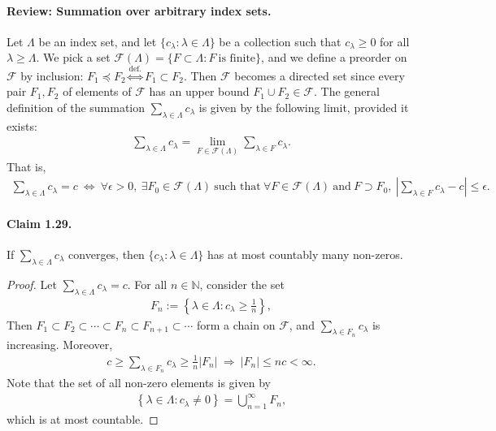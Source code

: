 \documentclass{article}
\begin{document}
\paragraph{Review: Summation over arbitrary index sets.} Let $\Lambda$ be an index set, and let $\{c_\lambda:\lambda\in\Lambda\}$ be a collection such that $c_\lambda\geq 0$ for all $\lambda\geq\Lambda$. We pick a set $\mathscr{F}(\Lambda)=\{F\subset\Lambda: F\ \text{is finite}\}$, and we define a preorder on $\mathscr{F}$ by inclusion: $F_1\preceq F_2\overset{\mathrm{def.}}{\Leftrightarrow} F_1\subset F_2$. Then $\mathscr{F}$ becomes a directed set since every pair $F_1,F_2$ of elements of $\mathscr{F}$ has an upper bound $F_1\cup F_2\in \mathscr{F}$. The general definition of the summation $\sum_{\lambda\in\Lambda} c_\lambda$ is given by the following limit, provided it exists:
\begin{align*}
	\sum_{\lambda\in\Lambda} c_\lambda = \lim_{F\in\mathscr{F}(\Lambda)}\sum_{\lambda\in F} c_\lambda.
\end{align*}
That is,
\begin{align*}
	\sum_{\lambda\in\Lambda} c_\lambda = c\ \Leftrightarrow\ \forall\epsilon > 0,\ \exists F_0\in\mathscr{F}(\Lambda)\ \text{such that}\ \forall F\in\mathscr{F}(\Lambda)\ \text{and}\ F\supset F_0,\ \left\vert\sum_{\lambda\in F}c_\lambda - c\right\vert\leq\epsilon.
\end{align*}
\paragraph{Claim 1.29.\label{claim:1.29}} If $\sum_{\lambda\in\Lambda}c_\lambda$ converges, then $\{c_\lambda:\lambda\in\Lambda\}$ has at most countably many non-zeros.

\begin{proof}
Let $\sum_{\lambda\in\Lambda}c_\lambda = c$. For all $n\in\mathbb{N}$, consider the set
\begin{align*}
	F_n:=\left\{\lambda\in\Lambda:c_\lambda\geq\frac{1}{n}\right\},
\end{align*}
Then $F_1\subset F_2\subset\cdots\subset F_n\subset F_{n+1}\subset\cdots$ form a chain on $\mathscr{F}$, and $\sum_{\lambda\in F_n}c_\lambda$ is increasing. Moreover,
\begin{align*}
	c\geq \sum_{\lambda\in F_n} c_\lambda \geq \frac{1}{n}\vert F_n\vert\ \Rightarrow\ \vert F_n\vert \leq nc < \infty.
\end{align*}
Note that the set of all non-zero elements is given by
\begin{align*}
	\left\{\lambda\in\Lambda:c_\lambda\neq 0\right\} = \bigcup_{n=1}^\infty F_n,
\end{align*}
which is at most countable.
\end{proof}
\end{document}
